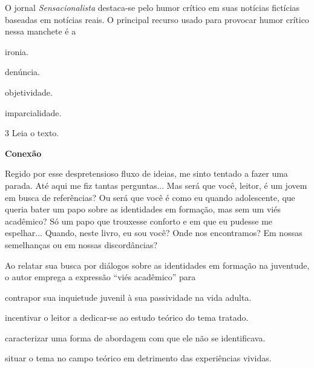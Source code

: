 O jornal \emph{Sensacionalista} destaca-se pelo humor crítico em suas
notícias fictícias baseadas em notícias reais. O principal recurso usado
para provocar humor crítico nessa manchete é a

\begin{escolha}
\item ironia.

\item denúncia.

\item objetividade.

\item imparcialidade.
\end{escolha}

\num{3} Leia o texto.

\begin{myquote}
\centering\textbf{Conexão}
\end{myquote}


\begin{myquote}
Regido por esse despretensioso fluxo de ideias, me sinto tentado a fazer
uma parada. Até aqui me fiz tantas perguntas... Mas será que você,
leitor, é um jovem em busca de referências? Ou será que você é como eu
quando adolescente, que queria bater um papo sobre as identidades em
formação, mas sem um viés acadêmico? Só um papo que trouxesse conforto e
em que eu pudesse me espelhar... Quando, neste livro, eu sou você? Onde
nos encontramos? Em nossas semelhanças ou em nossas discordâncias?
\end{myquote}


Ao relatar sua busca por diálogos sobre as identidades em formação na
juventude, o autor emprega a expressão ``viés acadêmico'' para

\begin{escolha}
\item contrapor sua inquietude juvenil à sua passividade na vida adulta.

\item incentivar o leitor a dedicar-se ao estudo teórico do tema tratado.

\item caracterizar uma forma de abordagem com que ele não se identificava.

\item situar o tema no campo teórico em detrimento das experiências
vividas.
\end{escolha}

